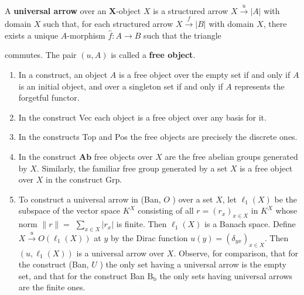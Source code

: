 \begin{example}
A \textbf{universal arrow} over an $\mathbf{X}$-object $X$ is a structured arrow $X \xrightarrow{u}|A|$ with domain $X$ such that, for each structured arrow $X \xrightarrow{f}|B|$ with domain $X$, there exists a unique $A$-morphism $\hat{f}: A \rightarrow B$ such that the triangle 
 commutes. The pair $(u,A)$ is called a \textbf{free object}.

\begin{example}
\begin{enumerate}
    \item In a construct, an object $A$ is a free object over the empty set if and only if $A$ is an initial object, and over a singleton set if and only if $A$ represents the forgetful functor.
    \item In the construct Vec each object is a free object over any basis for it.
    \item In the constructs Top and Pos the free objects are precisely the discrete ones.
    \item In the construct $\mathbf{A b}$ free objects over $X$ are the free abelian groups generated by $X$.
    Similarly, the familiar free group generated by a set $X$ is a free object over $X$ in the construct Grp.
    \item To construct a universal arrow in (Ban, $O$ ) over a set $X$, let $\ell_1(X)$ be the subspace of the vector space $K^X$ consisting of all $r=\left(r_x\right)_{x \in X}$ in $K^X$ whose norm $\|r\|=$ $\sum_{x \in X}\left|r_x\right|$ is finite. Then $\ell_1(X)$ is a Banach space. Define $X \xrightarrow{u} O\left(\ell_1(X)\right)$ at $y$ by the Dirac function $u(y)=\left(\delta_{y x}\right)_{x \in X}$. Then $\left(u, \ell_1(X)\right)$ is a universal arrow over $X$. Observe, for comparison, that for the construct (Ban, $U$ ) the only set having a universal arrow is the empty set, and that for the construct Ban $\mathrm{B}_{\mathrm{b}}$ the only sets having universal arrows are the finite ones.
\end{enumerate}
\end{example}


\end{example}
